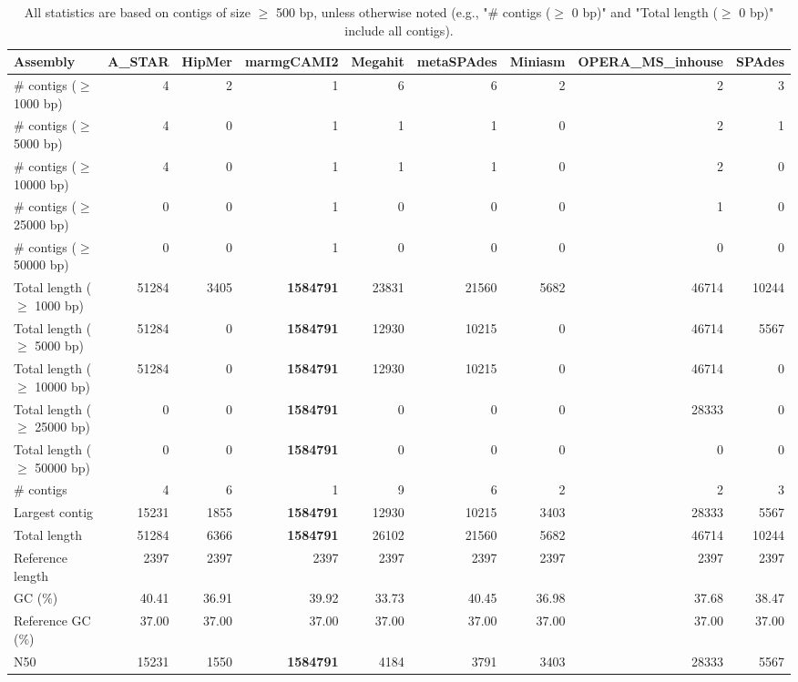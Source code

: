 \documentclass[12pt,a4paper]{article}
\begin{document}
\begin{table}[ht]
\begin{center}
\caption{All statistics are based on contigs of size $\geq$ 500 bp, unless otherwise noted (e.g., "\# contigs ($\geq$ 0 bp)" and "Total length ($\geq$ 0 bp)" include all contigs).}
\begin{tabular}{|l*{8}{|r}|}
\hline
Assembly & A\_STAR & HipMer & marmgCAMI2 & Megahit & metaSPAdes & Miniasm & OPERA\_MS\_inhouse & SPAdes \\ \hline
\# contigs ($\geq$ 1000 bp) & 4 & 2 & 1 & 6 & 6 & 2 & 2 & 3 \\ \hline
\# contigs ($\geq$ 5000 bp) & 4 & 0 & 1 & 1 & 1 & 0 & 2 & 1 \\ \hline
\# contigs ($\geq$ 10000 bp) & 4 & 0 & 1 & 1 & 1 & 0 & 2 & 0 \\ \hline
\# contigs ($\geq$ 25000 bp) & 0 & 0 & 1 & 0 & 0 & 0 & 1 & 0 \\ \hline
\# contigs ($\geq$ 50000 bp) & 0 & 0 & 1 & 0 & 0 & 0 & 0 & 0 \\ \hline
Total length ($\geq$ 1000 bp) & 51284 & 3405 & {\bf 1584791} & 23831 & 21560 & 5682 & 46714 & 10244 \\ \hline
Total length ($\geq$ 5000 bp) & 51284 & 0 & {\bf 1584791} & 12930 & 10215 & 0 & 46714 & 5567 \\ \hline
Total length ($\geq$ 10000 bp) & 51284 & 0 & {\bf 1584791} & 12930 & 10215 & 0 & 46714 & 0 \\ \hline
Total length ($\geq$ 25000 bp) & 0 & 0 & {\bf 1584791} & 0 & 0 & 0 & 28333 & 0 \\ \hline
Total length ($\geq$ 50000 bp) & 0 & 0 & {\bf 1584791} & 0 & 0 & 0 & 0 & 0 \\ \hline
\# contigs & 4 & 6 & 1 & 9 & 6 & 2 & 2 & 3 \\ \hline
Largest contig & 15231 & 1855 & {\bf 1584791} & 12930 & 10215 & 3403 & 28333 & 5567 \\ \hline
Total length & 51284 & 6366 & {\bf 1584791} & 26102 & 21560 & 5682 & 46714 & 10244 \\ \hline
Reference length & 2397 & 2397 & 2397 & 2397 & 2397 & 2397 & 2397 & 2397 \\ \hline
GC (\%) & 40.41 & 36.91 & 39.92 & 33.73 & 40.45 & 36.98 & 37.68 & 38.47 \\ \hline
Reference GC (\%) & 37.00 & 37.00 & 37.00 & 37.00 & 37.00 & 37.00 & 37.00 & 37.00 \\ \hline
N50 & 15231 & 1550 & {\bf 1584791} & 4184 & 3791 & 3403 & 28333 & 5567 \\ \hline

\end{tabular}
\end{center}
\end{table}
\end{document}
